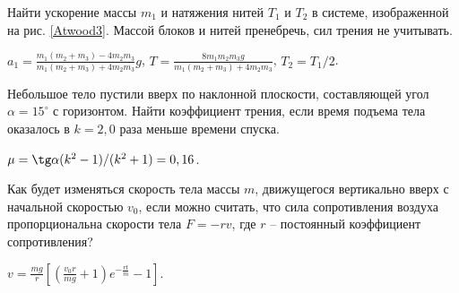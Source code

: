 \begin{ex} %
Найти ускорение массы $m_1$ и натяжения нитей $T_1$ и $T_2$ в системе, изображенной на рис. \ref{Atwood3}. Массой блоков и нитей пренебречь, сил трения не учитывать.
\begin{ans}
$a_1 = \frac{m_1(m_2+m_3)-4m_2m_3}{m_1(m_2+m_3)+4m_2m_3}g$, $T= \frac{8m_1m_2m_3g}{m_1(m_2+m_3)+4m_2m_3}$, $T_2 = T_1/2$.
\end{ans}
\end{ex}

\begin{ex} %
Небольшое тело пустили вверх по наклонной плоскости, составляющей угол $\alpha  = 15^{\circ}$ с горизонтом. Найти коэффициент трения, если время подъема тела оказалось в $k = 2,0$ раза меньше времени спуска.
\begin{ans}
$\mu = \tg \alpha (k^2-1)/(k^2+1) = 0,16$.
\end{ans}
\end{ex}

\begin{ex} %
Как будет изменяться скорость тела массы $m$, движущегося вертикально вверх с начальной скоростью $v_0$, если можно считать, что сила сопротивления воздуха пропорциональна скорости тела $F = -rv$, где $r$ -- постоянный коэффициент сопротивления?
\begin{ans}
$v = \frac{mg}{r}\left[ \left( \frac{v_0r}{mg} +1 \right)e^{-\frac{rt}{m}} - 1 \right]$.
\end{ans}
\end{ex}

\clearpage